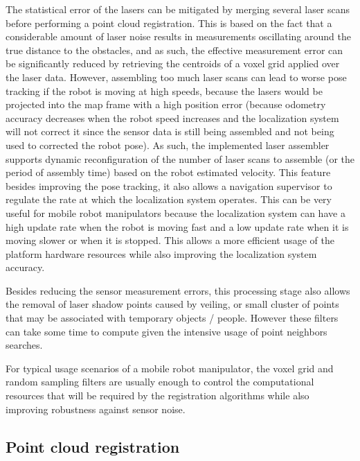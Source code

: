 The statistical error of the lasers can be mitigated by merging several laser scans before performing a point cloud registration. This is based on the fact that a considerable amount of laser noise results in measurements oscillating around the true distance to the obstacles, and as such, the effective measurement error can be significantly reduced by retrieving the centroids of a voxel grid applied over the laser data. However, assembling too much laser scans can lead to worse pose tracking if the robot is moving at high speeds, because the lasers would be projected into the map frame with a high position error (because odometry accuracy decreases when the robot speed increases and the localization system will not correct it since the sensor data is still being assembled and not being used to corrected the robot pose). As such, the implemented laser assembler supports dynamic reconfiguration of the number of laser scans to assemble (or the period of assembly time) based on the robot estimated velocity. This feature besides improving the pose tracking, it also allows a navigation supervisor to regulate the rate at which the localization system operates. This can be very useful for mobile robot manipulators because the localization system can have a high update rate when the robot is moving fast and a low update rate when it is moving slower or when it is stopped. This allows a more efficient usage of the platform hardware resources while also improving the localization system accuracy.

Besides reducing the sensor measurement errors, this processing stage also allows the removal of laser shadow points caused by veiling, or small cluster of points that may be associated with temporary objects / people. However these filters can take some time to compute given the intensive usage of point neighbors searches.

For typical usage scenarios of a mobile robot manipulator, the voxel grid and random sampling filters are usually enough to control the computational resources that will be required by the registration algorithms while also improving robustness against sensor noise.



\subsection{Point cloud registration}

